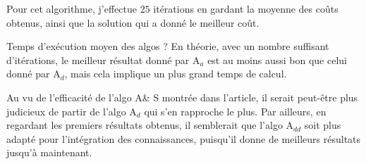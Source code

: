 \documentclass[a4paper,11pt]{article}%
\begin{document}
Pour cet algorithme, j'effectue $25$ itérations en gardant la moyenne des coûts obtenus, ainsi que la solution qui a donné le meilleur coût.

Temps d'exécution moyen des algos ?
En théorie, avec un nombre suffisant d'itérations, le meilleur résultat donné par A$_a$ est au moins aussi bon que celui donné par A$_d$, mais cela implique un plus grand temps de calcul.

Au vu de l'efficacité de l'algo A\& S montrée dans l'article, il serait peut-être plus judicieux de partir de l'algo A$_d$ qui s'en rapproche le plus. Par ailleurs, en regardant les premiers résultats obtenus, il semblerait que l'algo A$_{dd}$ soit plus adapté pour l'intégration des connaissances, puisqu'il donne de meilleurs résultats jusqu'à maintenant. 
\end{document}
